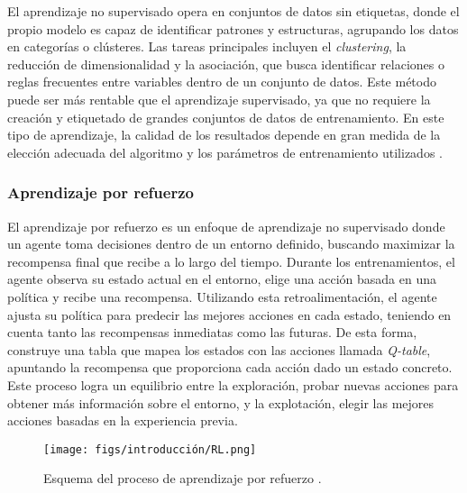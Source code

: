 El aprendizaje no supervisado opera en conjuntos de datos sin etiquetas, donde el propio modelo es capaz de identificar patrones y estructuras, agrupando los datos en categorías o clústeres. Las tareas principales incluyen el \textit{clustering}, la reducción de dimensionalidad y la asociación, que busca identificar relaciones o reglas frecuentes entre variables dentro de un conjunto de datos. Este método puede ser más rentable que el aprendizaje supervisado, ya que no requiere la creación y etiquetado de grandes conjuntos de datos de entrenamiento. En este tipo de aprendizaje, la calidad de los resultados depende en gran medida de la elección adecuada del algoritmo y los parámetros de entrenamiento utilizados \cite{no-supervised-learning}.

\subsubsection{Aprendizaje por refuerzo}
\label{sec:refuerzo}

El aprendizaje por refuerzo es un enfoque de aprendizaje no supervisado donde un agente toma decisiones dentro de un entorno definido, buscando maximizar la recompensa final que recibe a lo largo del tiempo. Durante los entrenamientos, el agente observa su estado actual en el entorno, elige una acción basada en una política y recibe una recompensa. Utilizando esta retroalimentación, el agente ajusta su política para predecir las mejores acciones en cada estado, teniendo en cuenta tanto las recompensas inmediatas como las futuras. De esta forma, construye una tabla que mapea los estados con las acciones llamada \textit{Q-table}, apuntando la recompensa que proporciona cada acción dado un estado concreto. Este proceso logra un equilibrio entre la exploración, probar nuevas acciones para obtener más información sobre el entorno, y la explotación, elegir las mejores acciones basadas en la experiencia previa.

\begin{figure}[ht]
\begin{center}
\texttt{[image: figs/introducción/RL.png]}
\end{center}
\caption{Esquema del proceso de aprendizaje por refuerzo \cite{reinforcement-learning-schema}.}
\label{rl}
\end{figure}

